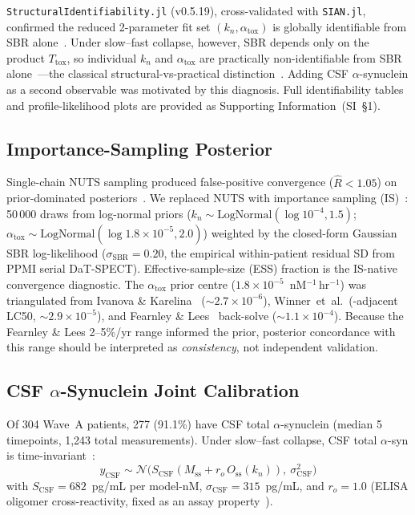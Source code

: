 \texttt{StructuralIdentifiability.jl} (v0.5.19), cross-validated with \texttt{SIAN.jl}, confirmed the reduced 2-parameter fit set $(k_n, \alpha_\text{tox})$ is globally identifiable from SBR alone~\cite{villaverde2016}. Under slow--fast collapse, however, SBR depends only on the product $T_\text{tox}$, so individual $k_n$ and $\alpha_\text{tox}$ are practically non-identifiable from SBR alone~\cite{gutenkunst2007,transtrum2015}---the classical structural-vs-practical distinction~\cite{raue2009}. Adding CSF $\alpha$-synuclein as a second observable was motivated by this diagnosis. Full identifiability tables and profile-likelihood plots are provided as Supporting Information~(SI~\S1).

\subsection*{Importance-Sampling Posterior}

Single-chain NUTS sampling produced false-positive convergence ($\hat{R}{<}1.05$) on prior-dominated posteriors~\cite{vehtari2021rhat}. We replaced NUTS with importance sampling (IS)~\cite{liu1998is}: 50\,000 draws from log-normal priors ($k_n \sim \text{LogNormal}(\log 10^{-4}, 1.5)$; $\alpha_\text{tox} \sim \text{LogNormal}(\log 1.8{\times}10^{-5}, 2.0)$) weighted by the closed-form Gaussian SBR log-likelihood ($\sigma_\text{SBR} = 0.20$, the empirical within-patient residual SD from PPMI serial DaT-SPECT). Effective-sample-size (ESS) fraction is the IS-native convergence diagnostic. The $\alpha_\text{tox}$ prior centre ($1.8{\times}10^{-5}$~nM$^{-1}$\,hr$^{-1}$) was triangulated from Ivanova \& Karelina~\cite{ivanova2024} ($\sim 2.7{\times}10^{-6}$), Winner~et~al.~(\citealp{cohen2012}-adjacent LC50, $\sim 2.9{\times}10^{-5}$), and Fearnley \& Lees~\cite{fearnley1991} back-solve ($\sim 1.1{\times}10^{-4}$). Because the Fearnley \& Lees 2--5\%/yr range informed the prior, posterior concordance with this range should be interpreted as \emph{consistency}, not independent validation.

\subsection*{CSF $\alpha$-Synuclein Joint Calibration}

Of 304 Wave~A patients, 277 (91.1\%) have CSF total $\alpha$-synuclein (median 5 timepoints, 1{,}243 total measurements). Under slow--fast collapse, CSF total $\alpha$-syn is time-invariant~\cite{mollenhauer2017csf}:
\begin{equation}
y_\text{CSF} \sim \mathcal{N}\bigl(S_\text{CSF}(M_\text{ss} + r_o\,O_\text{ss}(k_n)),\ \sigma_\text{CSF}^2\bigr)
\label{p7:eq:csf-obs}
\end{equation}
with $S_\text{CSF} = 682$~pg/mL per model-nM, $\sigma_\text{CSF} = 315$~pg/mL, and $r_o = 1.0$ (ELISA oligomer cross-reactivity, fixed as an assay property~\cite{petricca2022,koehler2008}).

